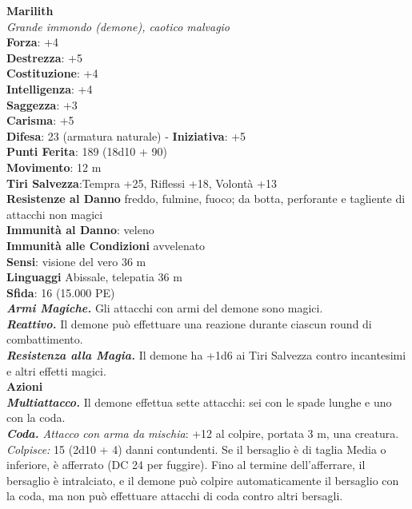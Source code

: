 \begin{multicols}{2}
\medskip\textbf{Marilith}\\
\emph{Grande immondo (demone), caotico malvagio}\\
\textbf{Forza}: +4\\
\textbf{Destrezza}: +5\\
\textbf{Costituzione}: +4\\
\textbf{Intelligenza}: +4\\
\textbf{Saggezza}: +3\\
\textbf{Carisma}: +5\\
\textbf{Difesa}: 23 (armatura naturale) - \textbf{Iniziativa}: +5\\
\textbf{Punti Ferita}: 189 (18d10 + 90)\\
\textbf{Movimento}: 12 m\\
\textbf{Tiri Salvezza}:Tempra +25, Riflessi +18, Volontà +13\\
\textbf{Resistenze al Danno} freddo, fulmine, fuoco; da botta, perforante e tagliente di attacchi non magici\\
\textbf{Immunità al Danno}: veleno\\
\textbf{Immunità alle Condizioni} avvelenato\\
\textbf{Sensi}: visione del vero 36 m\\
\textbf{Linguaggi} Abissale, telepatia 36 m\\
\textbf{Sfida}: 16 (15.000 PE)\smallskip\\
\emph{\textbf{Armi Magiche.}} Gli attacchi con armi del demone sono magici.\\
\emph{\textbf{Reattivo.}} Il demone può effettuare una reazione durante ciascun round di combattimento.\\
\emph{\textbf{Resistenza alla Magia.}} Il demone ha +1d6 ai Tiri Salvezza contro incantesimi e altri effetti magici.\\
\smallskip\textbf{Azioni}\\
\emph{\textbf{Multiattacco.}} Il demone effettua sette attacchi: sei con le spade lunghe e uno con la coda.\\
\emph{\textbf{Coda.} Attacco con arma da mischia}: +12 al colpire, portata 3 m, una creatura.\\
\emph{Colpisce:} 15 (2d10 + 4) danni contundenti. Se il bersaglio è di taglia Media o inferiore, è afferrato (DC  24 per fuggire). Fino al termine dell'afferrare, il bersaglio è intralciato, e il demone può colpire automaticamente il bersaglio con la coda, ma non può effettuare attacchi di coda contro altri bersagli.\\

\end{multicols}
